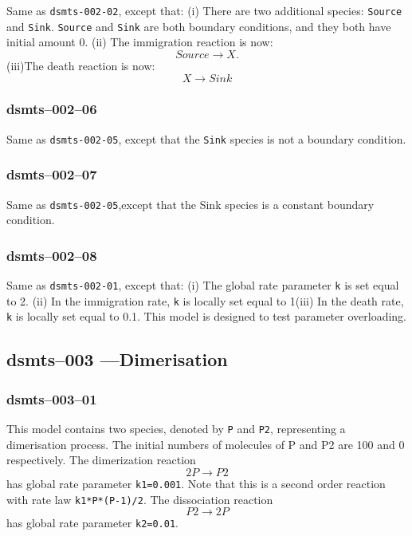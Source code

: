 Same as \verb$dsmts-002-02$, except that: (i) There are two additional
species: \verb$Source$ and \verb$Sink$. \verb$Source$ and \verb$Sink$
are both boundary conditions, and they both have initial amount
0. (ii) The immigration reaction is now: 
\[
Source \longrightarrow X. 
\]
(iii)The death reaction is now:
\[
X \longrightarrow Sink
\]


\subsubsection{dsmts--002--06} 

Same as \verb$dsmts-002-05$, except that the \verb$Sink$ species is
not a boundary condition. 


\subsubsection{dsmts--002--07} 

Same as \verb$dsmts-002-05$,except that the Sink species is a constant
boundary condition. 


\subsubsection{dsmts--002--08}

Same as \verb$dsmts-002-01$, except that: (i) The global rate
parameter \verb$k$ is set equal to 2. (ii) In the immigration rate,
\verb$k$ is locally set equal to 1(iii) In the death rate, \verb$k$ is
locally set equal to 0.1. This model is designed to test parameter
overloading. 


\subsection{dsmts--003 ---Dimerisation }

\subsubsection{dsmts--003--01}

This model contains two species, denoted by \verb$P$ and \verb$P2$,
representing a dimerisation process. The initial numbers of molecules
of P and P2 are 100 and 0 respectively. The dimerization reaction 
\[
2P \longrightarrow P2
\]
has global rate parameter \verb$k1=0.001$. Note
that this is a second order reaction with rate law
\verb$k1*P*(P-1)/2$. The dissociation reaction 
\[
P2 \longrightarrow 2P
\] 
has global rate parameter \verb$k2=0.01$. 

